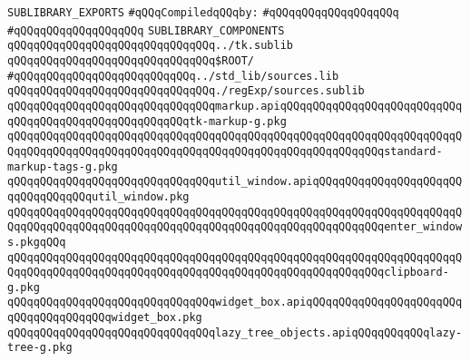 \label{src/lib/tk/src/toolkit/sources.sublib}
\verb|SUBLIBRARY_EXPORTS|\newline
\newline
\verb|#qQQqCompiledqQQqby:|\newline
\verb|#qQQqqQQqqQQqqQQqqQQq|\newline
\verb|#qQQqqQQqqQQqqQQqqQQq|\newline
\newline
\verb|SUBLIBRARY_COMPONENTS|\newline
\newline
\verb|qQQqqQQqqQQqqQQqqQQqqQQqqQQqqQQq../tk.sublib|\newline
\newline
\verb|qQQqqQQqqQQqqQQqqQQqqQQqqQQqqQQq$ROOT/|\newline
\newline
\verb|#qQQqqQQqqQQqqQQqqQQqqQQqqQQq../std_lib/sources.lib|\newline
\verb|qQQqqQQqqQQqqQQqqQQqqQQqqQQqqQQq./regExp/sources.sublib|\newline
\newline
\verb|qQQqqQQqqQQqqQQqqQQqqQQqqQQqqQQqmarkup.apiqQQqqQQqqQQqqQQqqQQqqQQqqQQqqQQqqQQqqQQqqQQqqQQqqQQqqQQqtk-markup-g.pkg|\newline
\verb|qQQqqQQqqQQqqQQqqQQqqQQqqQQqqQQqqQQqqQQqqQQqqQQqqQQqqQQqqQQqqQQqqQQqqQQqqQQqqQQqqQQqqQQqqQQqqQQqqQQqqQQqqQQqqQQqqQQqqQQqqQQqqQQqstandard-markup-tags-g.pkg|\newline
\newline
\verb|qQQqqQQqqQQqqQQqqQQqqQQqqQQqqQQqutil_window.apiqQQqqQQqqQQqqQQqqQQqqQQqqQQqqQQqqQQqutil_window.pkg|\newline
\verb|qQQqqQQqqQQqqQQqqQQqqQQqqQQqqQQqqQQqqQQqqQQqqQQqqQQqqQQqqQQqqQQqqQQqqQQqqQQqqQQqqQQqqQQqqQQqqQQqqQQqqQQqqQQqqQQqqQQqqQQqqQQqqQQqenter_windows.pkgqQQq|\newline
\verb|qQQqqQQqqQQqqQQqqQQqqQQqqQQqqQQqqQQqqQQqqQQqqQQqqQQqqQQqqQQqqQQqqQQqqQQqqQQqqQQqqQQqqQQqqQQqqQQqqQQqqQQqqQQqqQQqqQQqqQQqqQQqqQQqclipboard-g.pkg|\newline
\verb|qQQqqQQqqQQqqQQqqQQqqQQqqQQqqQQqwidget_box.apiqQQqqQQqqQQqqQQqqQQqqQQqqQQqqQQqqQQqqQQqwidget_box.pkg|\newline
\newline
\verb|qQQqqQQqqQQqqQQqqQQqqQQqqQQqqQQqlazy_tree_objects.apiqQQqqQQqqQQqlazy-tree-g.pkg|\newline
